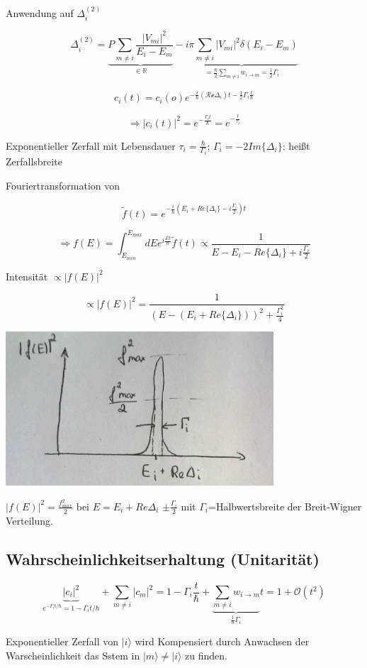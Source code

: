 Anwendung auf \(\Delta_i^{(2)}\)

\[\Delta_i^{(2)}= \underbrace{P\sum_{m\neq i}\frac{|V_{mi}|^2}{E_i-E_m}}_{\in \mathbb R}-\underbrace{i\pi\sum_{m\neq i}|V_{mi}|^2\delta(E_i-E_m)}_{=\frac{\hbar}{2}\sum_{m\neq i}w_{i\to m}=\frac{1}{2}\Gamma_i}\]

\[c_i(t) = c_i(o)e^{-\frac{i}{\hbar}(\mathcal{Re}\Delta_i)t-\frac{1}{2}\Gamma_i\frac{t}{\hbar}}\]

\[\Rightarrow |c_i(t)|^2 = e^{-\frac{\Gamma_i t}{\hbar}}= e^{-\frac{t}{\tau_i}}\]

Exponentieller Zerfall mit Lebensdauer \(\tau_i = \frac{\hbar}{\Gamma_i}\); \(\Gamma_i = -2Im\{\Delta_i\}\): heißt Zerfallsbreite

Fouriertransformation von 

\[\tilde f(t) = e^{-\frac{i}{\hbar}(E_i + Re\{\Delta_i\} - i\frac{\Gamma_i}{2})t}\]

\[\Rightarrow f(E) = \int_{E_{min}}^{E_{max}}dE e^{i\frac{Et}{\hbar}}\tilde f(t) \propto \frac{1}{E-E_i-Re\{\Delta_i\}+i\frac{\Gamma_i}{2}}\]

Intensität \(\propto |f(E)|^2 \)

\[\propto |f(E)|^2=  \frac{1}{(E-(E_i+Re\{\Delta_i\}))^2+\frac{\Gamma_i^2}{4}} \]


\includegraphics[width=0.75\textwidth]{kap03_13.png}

\(|f(E)|^2=\frac{f^2_{max}}{2}\) bei \(E=E_i + Re\Delta_i\) \(\pm\frac{\Gamma_i}{2}\) mit \(\Gamma_i\)=Halbwertsbreite der Breit-Wigner Verteilung.



\subsection{Wahrscheinlichkeitserhaltung (Unitarität)}

\[\underbrace{|c_i|^2}_{e^{-\Gamma_it/\hbar}=1-\Gamma_it/\hbar} + \sum_{m\neq i}|c_m|^2 = 1 - \Gamma_i\frac{t}{\hbar}+\underbrace{\sum_{m\neq i}w_{i\to m}}_{\frac{1}{\hbar}\Gamma_i}t=1+\mathcal O(t^2)\]

Exponentieller Zerfall von \(|i\rangle \) wird Kompensiert durch Anwachsen der Warscheinlichkeit das Sstem in \(|m\rangle \neq |i\rangle \) zu finden.



